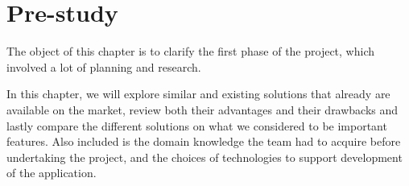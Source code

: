 \chapter{Pre-study}

\label{sec:prestudy}
The object of this chapter is to clarify the first phase of the project, which involved a lot of planning and research. 

In this chapter, we will explore similar and existing solutions that already are available on the market, review both their advantages and their drawbacks and lastly compare the different solutions on what we considered to be important features. Also included is the domain knowledge the team had to acquire before undertaking the project, and the choices of technologies to support development of the application.


\newpage




